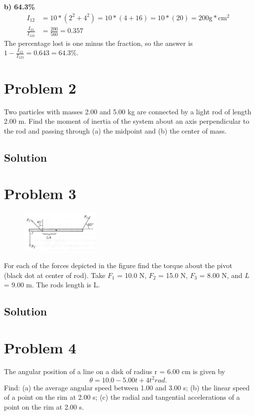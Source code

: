 \documentclass[12pt]{article}
\begin{document}
\textbf{b) 64.3\%}
\begin{align*}
    I_{12}  &=  10 * (2^2 + 4^2)
        =   10 * (4 + 16)
        =   10 * (20)
        =   200 \unit{\gram * \centi\meter^2}\\
    \frac{I_{23}}{I_{123}}  &=  \frac{200}{560}
        =   0.357
\end{align*}
The percentage lost is one minus the fraction, so the answer is $1 - \frac{I_{12}}{I_{123}} = 0.643 = \boxed{64.3\%}$.


\pagebreak
\section*{Problem 2}
Two particles with masses 2.00 and 5.00 kg are connected by a light rod of length 2.00 m.
Find the moment of inertia of the system about an axis perpendicular to the rod and passing
through (a) the midpoint and (b) the center of mass.

\subsection*{Solution}


\pagebreak
\section*{Problem 3}
\begin{figure}
    \vspace{-30pt}
    \includegraphics[width=0.35\textwidth]{graph_3.png} 
\end{figure}
For each of the forces depicted in the figure find the torque about the pivot (black dot at
center of rod). Take $F_1$ = 10.0 N, $F_2$ = 15.0 N, $F_3$ = 8.00 N, and $L$ = 9.00 m. The rods length
is L.

\subsection*{Solution}


\pagebreak
\section*{Problem 4}
The angular position of a line on a disk of radius r = 6.00 cm is given by
\[ \theta = 10.0 - 5.00 t + 4 t^2 rad. \]
Find: (a) the average angular speed between 1.00 and 3.00 s; (b) the linear speed of a point on
the rim at 2.00 s; (c) the radial and tangential accelerations of a point on the rim at 2.00 s.
\end{document}
